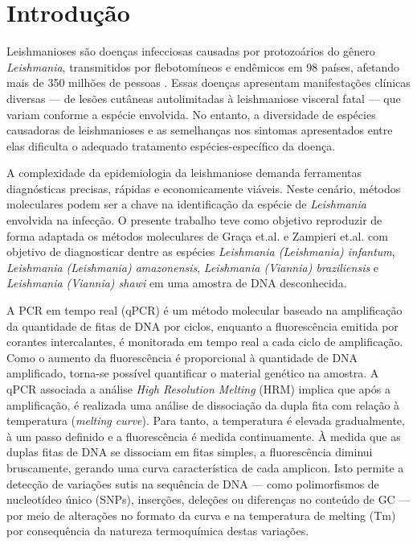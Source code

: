 \section{Introdução}

Leishmanioses são doenças infecciosas causadas por protozoários do gênero
\textit{Leishmania}, transmitidos por flebotomíneos e endêmicos em 98 países,
afetando mais de 350 milhões de pessoas \cite{hong2020one}. Essas doenças
apresentam manifestações clínicas diversas — de lesões cutâneas autolimitadas à
leishmaniose visceral fatal — que variam conforme a espécie envolvida. No
entanto, a diversidade de espécies causadoras de leishmanioses e as semelhanças
nos sintomas apresentados entre elas dificulta o adequado tratamento
espécies-específico da doença.

A complexidade da epidemiologia da leishmaniose demanda ferramentas diagnósticas
precisas, rápidas e economicamente viáveis.  Neste cenário, métodos moleculares
podem ser a chave na identificação da espécie de \textit{Leishmania} envolvida
na infecção. O presente trabalho teve como objetivo reproduzir de forma adaptada
os métodos moleculares de Graça
et.al.\cite{RFLPgraca2012} e Zampieri et.al.\cite{HRMzampi2016} com objetivo de
diagnosticar dentre as espécies \textit{Leishmania (Leishmania) infantum},
\textit{Leishmania (Leishmania) amazonensis}, \textit{Leishmania (Viannia)
braziliensis} e \textit{Leishmania (Viannia)
shawi} em uma amostra de DNA desconhecida. 

A PCR em tempo real (qPCR)  é um método molecular baseado na amplificação da
quantidade de fitas de DNA por ciclos, enquanto a fluorescência emitida por
corantes intercalantes, é monitorada em tempo real a cada ciclo de amplificação.
Como o aumento da fluorescência é proporcional à quantidade de DNA amplificado,
torna-se possível quantificar o material genético na amostra\cite{Galluzi2018}.
A qPCR associada a análise \textit{High Resolution Melting} (HRM) implica que
após a amplificação, é realizada uma análise de dissociação da dupla fita com
relação à temperatura (\textit{melting curve}). Para tanto, a temperatura é
elevada gradualmente, à um passo definido e a fluorescência é medida
continuamente. À medida que as duplas fitas de DNA se dissociam em fitas
simples, a fluorescência diminui bruscamente, gerando uma curva característica
de cada amplicon. Isto permite a detecção de variações sutis na sequência de DNA
— como polimorfismos de nucleotídeo único (SNPs), inserções, deleções ou
diferenças no conteúdo de GC — por meio de alterações no formato da curva e na
temperatura de melting (Tm)\cite{Wittwer2009} por consequência da natureza
termoquímica destas variações.


